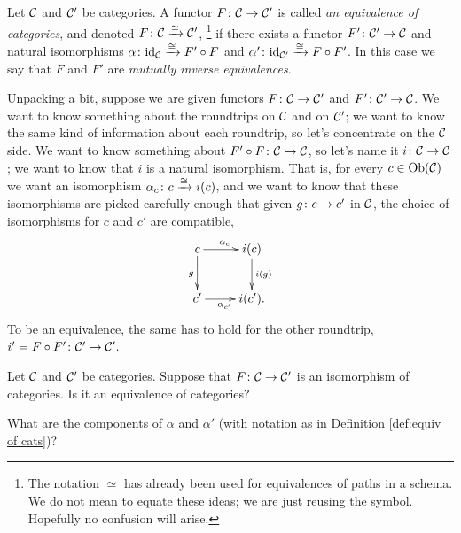 \documentclass[CT4S-EN-RU]{subfiles}
\begin{document}
\begin{blockRUS}
\end{blockRUS}

\begin{definitionENG}\label{def:equiv of cats}
Let $\mathcal{C}$ and $\mathcal{C}'$ be categories. A functor $F\colon\mathcal{C}\rightarrow\mathcal{C}'$ is called {\em an equivalence of categories}, and denoted $F\colon\mathcal{C}\xrightarrow{\simeq}\mathcal{C}'$,
\footnote{The notation $\simeq$ has already been used for equivalences of paths in a schema. We do not mean to equate these ideas; we are just reusing the symbol. Hopefully no confusion will arise.}
 if there exists a functor $F'\colon\mathcal{C}'\rightarrow\mathcal{C}$ and natural isomorphisms $\alpha\colon \textnormal{id}_\mathcal{C}\xrightarrow{\cong}F'\circ F$ and $\alpha'\colon\textnormal{id}_{\mathcal{C}'}\xrightarrow{\cong}F\circ F'$. In this case we say that $F$ and $F'$ are {\em mutually inverse equivalences}.
\end{definitionENG}

\begin{definitionRUS}\label{def:equiv of cats}
\end{definitionRUS}

\begin{blockENG}
Unpacking a bit, suppose we are given functors $F\colon\mathcal{C}\rightarrow\mathcal{C}'$ and $F'\colon\mathcal{C}'\rightarrow\mathcal{C}$. We want to know something about the roundtrips on $\mathcal{C}$ and on $\mathcal{C}'$; we want to know the same kind of information about each roundtrip, so let's concentrate on the $\mathcal{C}$ side. We want to know something about $F'\circ F\colon\mathcal{C}\rightarrow\mathcal{C}$, so let's name it $i\colon\mathcal{C}\rightarrow\mathcal{C}$; we want to know that $i$ is a natural isomorphism. That is, for every $c\in\textnormal{Ob}(\mathcal{C})$ we want an isomorphism $\alpha_c\colon c\xrightarrow{\cong} i(c)$, and we want to know that these isomorphisms are picked carefully enough that given $g\colon c\rightarrow c'$ in $\mathcal{C}$, the choice of isomorphisms for $c$ and $c'$ are compatible,
$$\xymatrix{c\ar[r]^{\alpha_c}\ar[d]_g&i(c)\ar[d]^{i(g)}\\c'\ar[r]_{\alpha_{c'}}&i(c').}$$
To be an equivalence, the same has to hold for the other roundtrip, $i'=F\circ F'\colon\mathcal{C}'\rightarrow\mathcal{C}'.$
\end{blockENG}

\begin{blockRUS}
\end{blockRUS}

\begin{exerciseENG}
Let $\mathcal{C}$ and $\mathcal{C}'$ be categories. Suppose that $F\colon\mathcal{C}\rightarrow\mathcal{C}'$ is an isomorphism of categories.
\sexc Is it an equivalence of categories?
\item What are the components of $\alpha$ and $\alpha'$ (with notation as in Definition \ref{def:equiv of cats})?
\endsexc
\end{exerciseENG}
\end{document}
